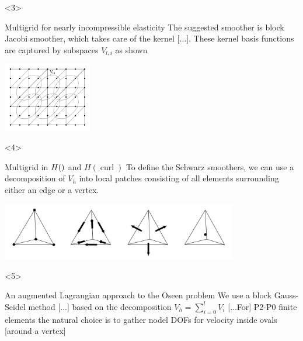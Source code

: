 \documentclass[presentation,aspectratio=43, 10pt]{beamer}
\let\div\relax
\DeclareMathOperator{\div}{div}
\DeclareMathOperator{\curl}{curl}
\begin{document}
\begin{frame}[t]
  \begin{onlyenv}<3>
    \begin{block}{Multigrid for nearly incompressible elasticity}
      The suggested smoother is block Jacobi smoother, which takes
      care of the kernel [...]. These kernel basis functions are
      captured by subspaces $V_{l,i}$ as shown
      \begin{center}
        \includegraphics[height=3cm]{schoeberl}
      \end{center}
      \begin{flushright}
        \textcite{Schoeberl:1999} \hspace{4em}
      \end{flushright}
    \end{block}
  \end{onlyenv}

  \begin{onlyenv}<4>
    \begin{block}{Multigrid in $H(\div)$ and $H(\curl)$}
      To define the Schwarz smoothers, we can use a decomposition of
      $V_h$ into local patches consisting of all elements surrounding
      either an edge or a vertex.

      \begin{center}
        \includegraphics[height=2.5cm]{arnold}
      \end{center}
      \begin{flushright}
        \textcite{Arnold:2000} \hspace{4em}
      \end{flushright}
    \end{block}
  \end{onlyenv}

  \begin{onlyenv}<5>
    \begin{block}{An augmented Lagrangian approach to the Oseen problem}
      We use a block Gauss-Seidel method [...] based on the
      decomposition $V_h = \sum_{i=0}^l V_i$ [...For] P2-P0 finite
      elements the natural choice is to gather nodel DOFs for velocity
      inside ovals [around a vertex]


\end{block}
\end{onlyenv}
\end{frame}
\end{document}
